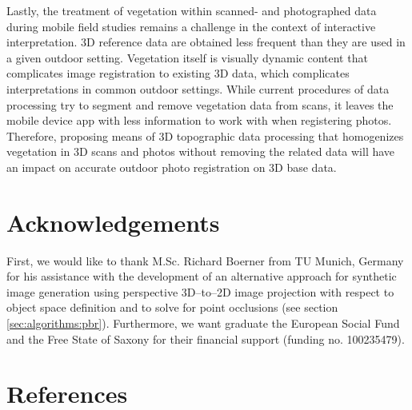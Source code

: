 \documentclass[review]{elsarticle}
\begin{document}
Lastly, the treatment of vegetation within scanned- and photographed data during mobile field studies remains a challenge in the context of interactive interpretation. 3D reference data are obtained less frequent than they are used in a given outdoor setting. Vegetation itself is visually dynamic content that complicates image registration to existing 3D data, which complicates interpretations in common outdoor settings. While current procedures of data processing try to segment and remove vegetation data from scans, it leaves the mobile device app with less information to work with when registering photos. Therefore, proposing means of 3D topographic data processing that homogenizes vegetation in 3D scans and photos without removing the related data will have an impact on accurate outdoor photo registration on 3D base data.




\section*{Acknowledgements}
First, we would like to thank M.Sc. Richard Boerner from TU Munich, Germany for his assistance with the development of an alternative approach for synthetic image generation using perspective 3D--to--2D image projection with respect to object space definition and to solve for point occlusions (see section \ref{sec:algorithms:pbr}). Furthermore, we want graduate the European Social Fund and the Free State of Saxony for their financial support (funding no. 100235479).

\section*{References}


\end{document}
